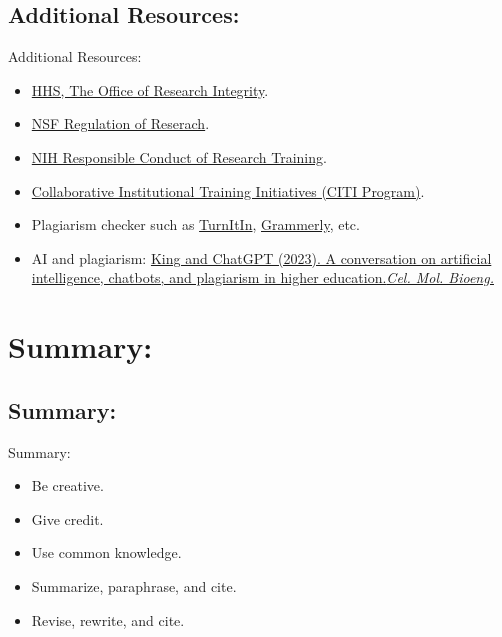 \documentclass[11pt]{beamer}
\begin{document}
\subsection{Additional Resources:}
\begin{frame}{Additional Resources:}
\begin{itemize}
	\item {\color{blue}\href{https://ori.hhs.gov/}{HHS, The Office of Research Integrity}}.
	\smallskip
	\item {\color{blue}\href{https://www.nsf.gov/od/ogc/regulation.jsp}{NSF Regulation of Reserach}}.
	\smallskip
	\item {\color{blue}\href{https://oir.nih.gov/sourcebook/ethical-conduct/responsible-conduct-research-training}{NIH Responsible Conduct of Research Training}}.
	\smallskip
	\item {\color{blue}\href{https://about.citiprogram.org/}{Collaborative Institutional Training Initiatives (CITI Program)}}.
	\smallskip
	\item Plagiarism checker such as {\color{blue}\href{https://www.turnitin.com/}{TurnItIn}}, {\color{blue}\href{https://app.grammarly.com/}{Grammerly}}, etc.
	\smallskip
	\item AI and plagiarism: {\color{blue}\href{https://doi.org/10.1007/s12195-022-00754-8}{King and ChatGPT (2023). A conversation on artificial intelligence, chatbots, and plagiarism in higher education.\textit{Cel. Mol. Bioeng.}}}
\end{itemize}
\end{frame}

\section{Summary:}
\subsection{Summary:}
\begin{frame}{Summary:}
	\begin{itemize}
		\item Be creative.
		\vspace{0.2 cm}
		\item Give credit.
		\vspace{0.2 cm}
		\item Use common knowledge.
		\vspace{0.2 cm}
		\item Summarize, paraphrase, and cite.
		\vspace{0.2 cm}
		\item Revise, rewrite, and cite.	
	\end{itemize}
\end{frame}
\end{document}
